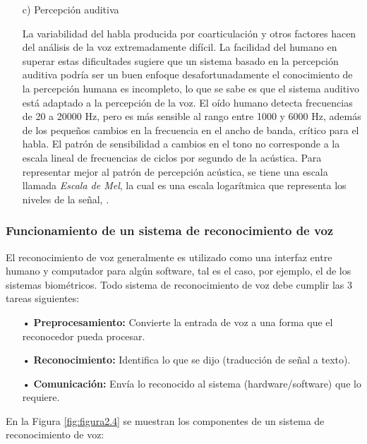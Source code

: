 \begin{enumerate}
\item[c)]Percepción auditiva
\par
La variabilidad del habla producida por coarticulación y otros factores hacen del análisis de la voz extremadamente difícil. La facilidad del humano en superar estas dificultades sugiere que un sistema basado en la percepción auditiva podría ser un buen enfoque desafortunadamente el conocimiento de la percepción humana es incompleto, lo que se sabe es que el sistema auditivo está adaptado a la percepción de la voz.
\vskip 0.5cm
El oído humano detecta frecuencias de 20 a 20000 Hz, pero es más sensible al rango entre 1000 y 6000 Hz, además de los pequeños cambios en la frecuencia en el ancho de banda, crítico para el habla. El patrón de sensibilidad a cambios en el tono no corresponde a la escala lineal de frecuencias de ciclos por segundo de la acústica. Para representar mejor al patrón de percepción acústica, se tiene una escala llamada \textit{Escala de Mel}, la cual es una escala logarítmica que representa los niveles de la señal, \cite{eyra}.
\end{enumerate}

\subsubsection{Funcionamiento de un sistema de reconocimiento de voz}
El reconocimiento de voz generalmente es utilizado como una interfaz entre humano y computador para algún software, tal es el caso, por ejemplo, el de los sistemas biométricos. Todo sistema de reconocimiento de voz debe cumplir las 3 tareas siguientes:

\begin{enumerate}
\item[•]\textbf{Preprocesamiento:} Convierte la entrada de voz a una forma que el reconocedor pueda procesar.
\item[•]\textbf{Reconocimiento:} Identifica lo que se dijo (traducción de señal a texto).
\item[•]\textbf{Comunicación:} Envía lo reconocido al sistema (hardware/software) que lo requiere.
\end{enumerate}

En la Figura \ref{fig:figura2.4} se muestran los componentes de un sistema de reconocimiento de voz:


